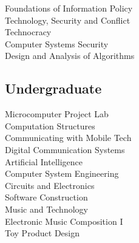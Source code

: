 \documentclass[letterpaper]{deedy-resume} %
\begin{document}
\begin{minipage}[t]{0.33\textwidth}
Foundations of Information Policy \\  %
Technology, Security and Conflict \\  %
Technocracy \\                        %
Computer Systems Security \\          %
Design and Analysis of Algorithms \\  %


\sectionspace %


\subsection{Undergraduate}

Microcomputer Project Lab \\          %
Computation Structures \\             %
Communicating with Mobile Tech \\     %
Digital Communication Systems \\      %
Artificial Intelligence \\            %
Computer System Engineering \\        %
Circuits and Electronics \\           %
Software Construction \\              %
Music and Technology \\               %
Electronic Music Composition I \\     %
Toy Product Design                    %

\sectionspace %



\end{minipage}
\end{document}
